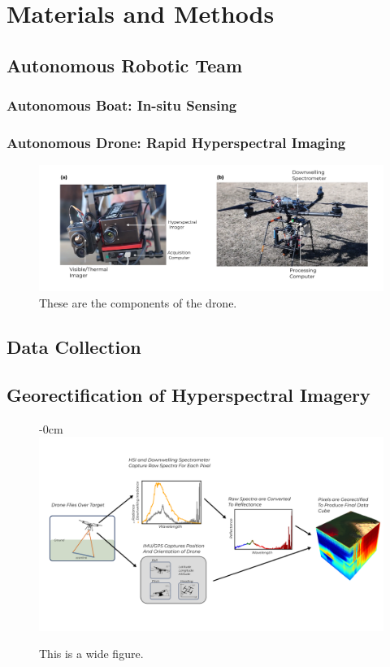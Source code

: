 \documentclass[journal,article,submit,pdftex,moreauthors]{Definitions/mdpi}
\begin{document}
\section{Materials and Methods}

\subsection{Autonomous Robotic Team}
\subsubsection{Autonomous Boat: In-situ Sensing}
\subsubsection{Autonomous Drone: Rapid Hyperspectral Imaging}

\begin{figure}[H]
\includegraphics[width=\columnwidth]{paper/figures/materials-and-methods/annotated-drone.pdf}
\caption{These are the components of the drone. \label{fig:drone-components}}
\end{figure} 


\subsection{Data Collection}
\subsection{Georectification of Hyperspectral Imagery}


\begin{figure}[H]
\begin{adjustwidth}{-\extralength}{0cm}
\centering
\includegraphics[width=15.5cm]{paper/figures/materials-and-methods/pipeline-figure-2.pdf}
\end{adjustwidth}
\caption{This is a wide figure.\label{fig:hsi-pipeline}}
\end{figure}  
\end{document}
